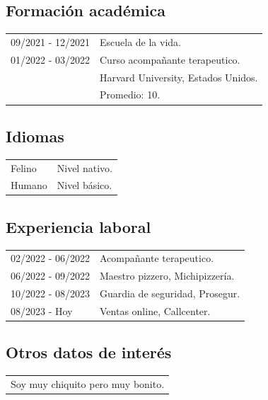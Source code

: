 \documentclass[12pt]{article}
\begin{document}
\subsection*{Formación académica}
\begin{tabular}{l l}
  09/2021 - 12/2021&Escuela de la vida.\\
  01/2022 - 03/2022&Curso acompañante terapeutico.\\
             &Harvard University, Estados Unidos.\\
             &\small{Promedio: 10.}
\end{tabular}
\subsection*{Idiomas}
\begin{tabular}{l l}
  Felino&Nivel nativo.\\
  Humano&Nivel básico.\\
\end{tabular}
\subsection*{Experiencia laboral}
\begin{tabular}{l l}
  02/2022 - 06/2022&Acompañante terapeutico.\\
  06/2022 - 09/2022&Maestro pizzero, Michipizzería.\\
  10/2022 - 08/2023&Guardia de seguridad, Prosegur.\\
  08/2023 - Hoy&Ventas online, Callcenter.\\
\end{tabular}
\subsection*{Otros datos de interés}
\begin{tabular}{l}
  Soy muy chiquito pero muy bonito.
\end{tabular}
\end{document}
